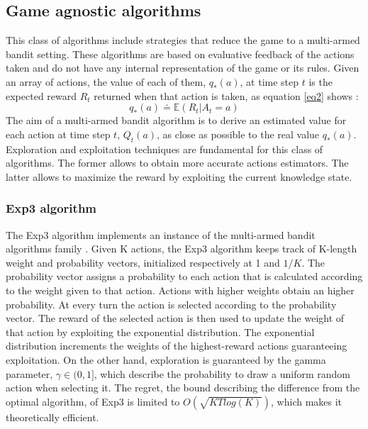 \documentclass[runningheads]{llncs}
\begin{document}
\subsection{Game agnostic algorithms}
This class of algorithms include strategies that reduce the game
to a multi-armed bandit setting. These algorithms are based on
evaluative feedback of the actions taken and do not have any internal
representation of the game or its rules. Given an array
of actions, the value of each of them, $q_*(a)$, at time step $t$ is the expected
reward $R_t$ returned when that action is taken, as equation \ref{eq2}
shows \cite{rlbook}:
\begin{equation}\label{eq2}
  q_*(a) \doteq \mathbb{E}(R_t | A_t = a)
\end{equation}
The aim of a multi-armed bandit algorithm is to derive an estimated
value for each action at time step $t$, $Q_t(a)$, as close as possible
to the real value $q_*(a)$. Exploration and exploitation techniques
are fundamental for this class of algorithms. The former allows to
obtain more accurate actions estimators. The latter allows to maximize
the reward by exploiting the current knowledge state.

\subsubsection{Exp3 algorithm}
The Exp3 algorithm implements an instance of the multi-armed bandit
algorithms family \cite{exp3}. Given K actions, the Exp3 algorithm keeps track of
K-length weight and probability vectors, initialized respectively at 1
and $1/K$. The probability vector assigns a probability to each action
that is calculated according to the weight given to that
action. Actions with higher weights obtain an higher probability. At
every turn the action is selected according to the probability
vector. The reward of the selected action is then used to update the
weight of that action by exploiting the exponential distribution. The
exponential distribution increments the weights of the highest-reward
actions guaranteeing exploitation. On the other hand, exploration is
guaranteed by the gamma parameter, $\gamma \in (0, 1]$, which describe the probability to
draw a uniform random action when selecting it. The regret, the bound
describing the difference from the optimal algorithm, of Exp3 is
limited to $O(\sqrt{KTlog(K)})$, which makes it theoretically
efficient.
\end{document}
